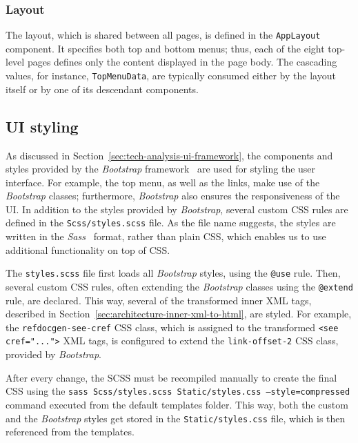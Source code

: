 \subsubsection{Layout}

The layout, which is shared between all pages, is defined in the \texttt{AppLayout} component.
It specifies both top and bottom menus; thus, each of the eight top-level pages defines only the content displayed in the page body.
The cascading values, for instance, \texttt{TopMenuData}, are typically consumed either by the layout itself or by one of its descendant components.

\subsection{UI styling}
\label{sec:ui-styling}

As discussed in Section~\ref{sec:tech-analysis-ui-framework}, the components and styles provided by the \textit{Bootstrap} framework~\cite{boostrap} are used for styling the user interface.
For example, the top menu, as well as the links, make use of the \textit{Bootstrap} classes; furthermore, \textit{Bootstrap} also ensures the responsiveness of the UI.
In addition to the styles provided by \textit{Bootstrap}, several custom CSS rules are defined in the \texttt{Scss/styles.scss} file.
As the file name suggests, the styles are written in the \textit{Sass}~\cite{sass} format, rather than plain CSS, which enables us to use additional functionality on top of CSS.

The \texttt{styles.scss} file first loads all \textit{Bootstrap} styles, using the \texttt{@use} rule.
Then, several custom CSS rules, often extending the \textit{Bootstrap} classes using the \texttt{@extend} rule, are declared.
This way, several of the transformed inner XML tags, described in Section~\ref{sec:architecture-inner-xml-to-html}, are styled.
For example, the \texttt{refdocgen-see-cref} CSS class, which is assigned to the transformed \texttt{<see cref="...">} XML tags, is configured to extend the \texttt{link-offset-2} CSS class, provided by \textit{Bootstrap}.

After every change, the SCSS must be recompiled manually to create the final CSS using the \texttt{sass Scss/styles.scss Static/styles.css --style=com\-pressed} command executed from the default templates folder.
This way, both the custom and the \textit{Bootstrap} styles get stored in the \texttt{Static/styles.css} file, which is then referenced from the templates.

